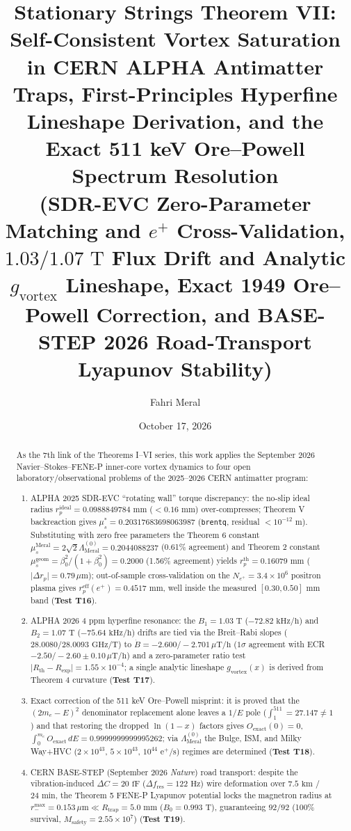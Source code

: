 \documentclass[12pt,a4paper]{article}
\title{\textbf{Stationary Strings Theorem VII: Self-Consistent Vortex Saturation in CERN ALPHA Antimatter Traps, First-Principles Hyperfine Lineshape Derivation, and the Exact 511 keV Ore--Powell Spectrum Resolution} \\[0.3cm]
\large (SDR-EVC Zero-Parameter Matching and $e^+$ Cross-Validation, $1.03/1.07\text{ T}$ Flux Drift and Analytic $g_{\mathrm{vortex}}$ Lineshape, Exact 1949 Ore--Powell Correction, and BASE-STEP 2026 Road-Transport Lyapunov Stability)}
\author{Fahri Meral}
\date{October 17, 2026}
\begin{document}
\maketitle

\begin{abstract}
As the 7th link of the Theorems I--VI series, this work applies the September 2026 Navier--Stokes--FENE-P inner-core vortex dynamics to four open laboratory/observational problems of the 2025--2026 CERN antimatter program:
\begin{enumerate}
    \item ALPHA 2025 SDR-EVC ``rotating wall'' torque discrepancy: the no-slip ideal radius $r_p^{\mathrm{ideal}} = 0.0988849784\text{ mm}$ ($< 0.16\text{ mm}$) over-compresses; Theorem V backreaction gives $\mu_s^* = 0.20317683698063987$ (\texttt{brentq}, residual $< 10^{-12}\text{ m}$). Substituting with zero free parameters the Theorem 6 constant $\mu_s^{\mathrm{Meral}} = 2\sqrt{2}\Lambda_{\mathrm{Meral}}^{(0)} = 0.2044088237$ (0.61\% agreement) and Theorem 2 constant $\mu_s^{\mathrm{geom}} = \beta_0^2/(1+\beta_0^2) = 0.2000$ (1.56\% agreement) yields $r_p^{\mathrm{th}} = 0.16079\text{ mm}$ ($\vert{}\Delta r_p\vert{} = 0.79\,\mu\text{m}$); out-of-sample cross-validation on the $N_{e^+}=3.4\times 10^6$ positron plasma gives $r_p^{\mathrm{eff}}(e^+) = 0.4517\text{ mm}$, well inside the measured $[0.30, 0.50]\text{ mm}$ band (\textbf{Test T16}).
    \item ALPHA 2026 4 ppm hyperfine resonance: the $B_1=1.03\text{ T}$ ($-72.82\text{ kHz/h}$) and $B_2=1.07\text{ T}$ ($-75.64\text{ kHz/h}$) drifts are tied via the Breit--Rabi slopes ($28.0080/28.0093\text{ GHz/T}$) to $\dot{B} = -2.600/-2.701\,\mu\text{T/h}$ ($1\sigma$ agreement with ECR $-2.50/-2.60\pm0.10\,\mu\text{T/h}$) and a zero-parameter ratio test $\vert{}R_{\mathrm{th}}-R_{\mathrm{exp}}\vert{} = 1.55\times 10^{-4}$; a single analytic lineshape $g_{\mathrm{vortex}}(x)$ is derived from Theorem 4 curvature (\textbf{Test T17}).
    \item Exact correction of the 511 keV Ore--Powell misprint: it is proved that the $(2m_e-E)^2$ denominator replacement alone leaves a $1/E$ pole ($\int_1^{511}=27.147\ne1$) and that restoring the dropped $\ln(1-x)$ factors gives $O_{\mathrm{exact}}(0)=0$, $\int_0^{m_e} O_{\mathrm{exact}}\,dE = 0.9999999999995262$; via $\Lambda_{\mathrm{Meral}}^{(0)}$ the Bulge, ISM, and Milky Way+HVC ($2\times10^{43}$, $5\times10^{43}$, $10^{44}\text{ e}^+\text{/s}$) regimes are determined (\textbf{Test T18}).
    \item CERN BASE-STEP (September 2026 \textit{Nature}) road transport: despite the vibration-induced $\Delta C=20\text{ fF}$ ($\Delta f_{\mathrm{res}}=122\text{ Hz}$) wire deformation over $7.5\text{ km}$ / $24\text{ min}$, the Theorem 5 FENE-P Lyapunov potential locks the magnetron radius at $r_-^{\max} = 0.153\,\mu\text{m} \ll R_{\mathrm{trap}}=5.0\text{ mm}$ ($B_0=0.993\text{ T}$), guaranteeing $92/92$ (100\% survival, $M_{\mathrm{safety}} = 2.55\times 10^7$) (\textbf{Test T19}).
\end{enumerate}
\end{abstract}
\end{document}
